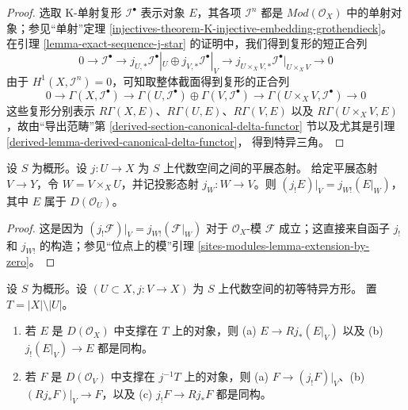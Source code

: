 \begin{proof}
选取 K-单射复形 $\mathcal{I}^\bullet$ 表示对象 $E$，其各项
$\mathcal{I}^n$ 都是 $\textit{Mod}(\mathcal{O}_X)$ 中的单射对象；参见“单射”定理
\ref{injectives-theorem-K-injective-embedding-grothendieck}。
在引理 \ref{lemma-exact-sequence-j-star} 的证明中，我们得到复形的短正合列
$$
0 \to \mathcal{I}^\bullet \to
j_{U, *}\mathcal{I}^\bullet|_U \oplus j_{V, *}\mathcal{I}^\bullet|_V \to
j_{U \times_X V, *}\mathcal{I}^\bullet|_{U \times_X V} \to 0
$$
由于 $H^1(X, \mathcal{I}^n) = 0$，可知取整体截面得到复形的正合列
$$
0 \to \Gamma(X, \mathcal{I}^\bullet) \to
\Gamma(U, \mathcal{I}^\bullet) \oplus
\Gamma(V, \mathcal{I}^\bullet) \to
\Gamma(U \times_X V, \mathcal{I}^\bullet) \to 0
$$
这些复形分别表示
$R\Gamma(X, E)$、$R\Gamma(U, E)$、$R\Gamma(V, E)$ 以及
$R\Gamma(U \times_X V, E)$，故由“导出范畴”第
\ref{derived-section-canonical-delta-functor} 节以及尤其是引理
\ref{derived-lemma-derived-canonical-delta-functor}，
得到特异三角。
\end{proof}

\begin{lemma}
\label{lemma-restrict-lower-shriek}
设 $S$ 为概形。设 $j : U \to X$ 为 $S$ 上代数空间之间的平展态射。
给定平展态射 $V \to Y$，令 $W = V \times_X U$，并记投影态射 %
$j_W : W \to V$。则
$(j_!E)|_V = j_{W!}(E|_W)$，其中 $E$ 属于 $D(\mathcal{O}_U)$。
\end{lemma}

\begin{proof}
这是因为
$(j_!\mathcal{F})|_V = j_{W!}(\mathcal{F}|_W)$
对于 $\mathcal{O}_X$-模 $\mathcal{F}$ 成立；这直接来自函子 $j_!$ 和 $j_{W!}$ 的构造；参见“位点上的模”引理
\ref{sites-modules-lemma-extension-by-zero}。
\end{proof}

\begin{lemma}
\label{lemma-pushforward-with-support-in-open}
设 $S$ 为概形。设 $(U \subset X, j : V \to X)$ 为 $S$ 上代数空间的初等特异方形。
置 $T = |X| \setminus |U|$。
\begin{enumerate}
\item 若 $E$ 是 $D(\mathcal{O}_X)$ 中支撑在 $T$ 上的对象，则
(a) $E \to Rj_*(E|_V)$ 以及 (b) $j_!(E|_V) \to E$ 都是同构。
\item 若 $F$ 是 $D(\mathcal{O}_V)$ 中支撑在 $j^{-1}T$ 上的对象，则
(a) $F \to (j_!F)|_V$、(b) $(Rj_*F)|_V \to F$，以及 (c)
$j_!F \to Rj_*F$ 都是同构。
\end{enumerate}
\end{lemma}

